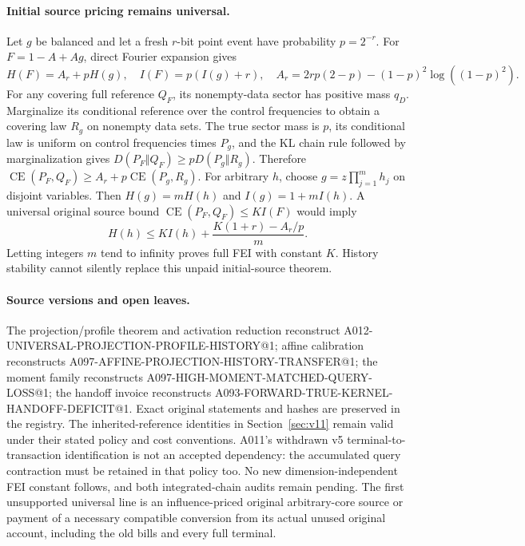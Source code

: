 \documentclass[11pt]{article}
\begin{document}
\paragraph{Initial source pricing remains universal.}
Let $g$ be balanced and let a fresh $r$-bit point event have probability $p=2^{-r}$.
For $F=1-A+Ag$, direct Fourier expansion gives
\[
 H(F)=A_r+pH(g),\quad I(F)=p(I(g)+r),\quad
 A_r=2rp(2-p)-(1-p)^2\log((1-p)^2).
\]
For any covering full reference $Q_F$, its nonempty-data sector has positive mass
$q_D$. Marginalize its conditional reference over the control frequencies to obtain
a covering law $R_g$ on nonempty data sets. The true sector mass is $p$, its
conditional law is uniform on control frequencies times $P_g$, and the KL chain rule
followed by marginalization gives $D(P_F\Vert Q_F)\geq pD(P_g\Vert R_g)$.
Therefore
$\operatorname{CE}(P_F,Q_F)\geq A_r+p\operatorname{CE}(P_g,R_g)$.
For arbitrary $h$, choose $g=z\prod_{j=1}^m h_j$ on disjoint variables. Then
$H(g)=mH(h)$ and $I(g)=1+mI(h)$.
A universal original source bound $\operatorname{CE}(P_F,Q_F)\leq KI(F)$ would imply
\[
 H(h)\leq KI(h)+\frac{K(1+r)-A_r/p}{m}.
\]
Letting integers $m$ tend to infinity proves full FEI with constant $K$.
History stability cannot silently replace this unpaid initial-source theorem.

\paragraph{Source versions and open leaves.}
The projection/profile theorem and activation reduction reconstruct
A012-UNIVERSAL-PROJECTION-PROFILE-HISTORY@1; affine calibration reconstructs
A097-AFFINE-PROJECTION-HISTORY-TRANSFER@1; the moment family reconstructs
A097-HIGH-MOMENT-MATCHED-QUERY-LOSS@1; the handoff invoice reconstructs
A093-FORWARD-TRUE-KERNEL-HANDOFF-DEFICIT@1. Exact original statements and hashes
are preserved in the registry. The inherited-reference identities in
Section~\ref{sec:v11} remain valid under their stated policy and cost conventions.
A011's withdrawn v5 terminal-to-transaction identification is not an accepted
dependency: the accumulated query contraction must be retained in that policy too.
No new dimension-independent FEI constant follows, and both integrated-chain audits
remain pending. The first unsupported universal line is an influence-priced original
arbitrary-core source or payment of a necessary compatible conversion from its actual
unused original account, including the old bills and every full terminal.
\end{document}
